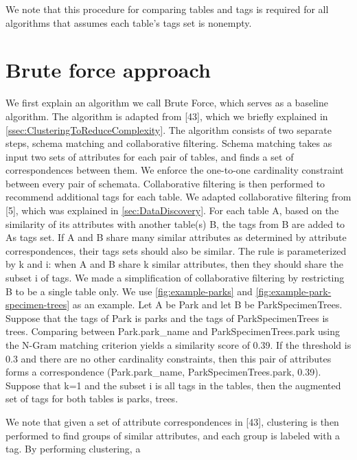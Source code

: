 We note that this procedure for comparing tables and tags is required for all algorithms that assumes each table\textquoteright s tags set is nonempty.

\section{Brute force approach}
\label{sec:BruteForceApproach}

We first explain an algorithm we call Brute Force, which serves as a baseline algorithm. The algorithm is adapted from \cite{Smith2011Unity}[43], which we briefly explained in \autoref{ssec:ClusteringToReduceComplexity}. The algorithm consists of two separate steps, schema matching and collaborative filtering. Schema matching takes as input two sets of attributes for each pair of tables, and finds a set of correspondences between them. We enforce the one-to-one cardinality constraint between every pair of schemata. Collaborative filtering is then performed to recommend additional tags for each table. We adapted collaborative filtering from \cite{conf/esws/EllefiBDT16}[5], which was explained in \autoref{sec:DataDiscovery}. For each table A, based on the similarity of its attributes with another table(s) B, the tags from B are added to As tags set. If A and B share many similar attributes as determined by attribute correspondences, their tags sets should also be similar. The rule is parameterized by k and i: when A and B share k similar attributes, then they should share the subset i of tags. We made a simplification of collaborative filtering by restricting B to be a single table only.
We use \autoref{fig:example-parks} and \autoref{fig:example-park-specimen-trees} as an example. Let A be Park and let B be ParkSpecimenTrees. Suppose that the tags of Park is {parks} and the tags of ParkSpecimenTrees is {trees}. Comparing between Park.park\_name and ParkSpecimenTrees.park using the N-Gram matching criterion yields a similarity score of 0.39. If the threshold is 0.3 and there are no other cardinality constraints, then this pair of attributes forms a correspondence (Park.park\_name, ParkSpecimenTrees.park, 0.39). Suppose that k=1 and the subset i is all tags in the tables, then the augmented set of tags for both tables is {parks, trees}.


We note that given a set of attribute correspondences in \cite{Smith2011Unity}[43], clustering is then performed to find groups of similar attributes, and each group is labeled with a tag. By performing clustering, a

